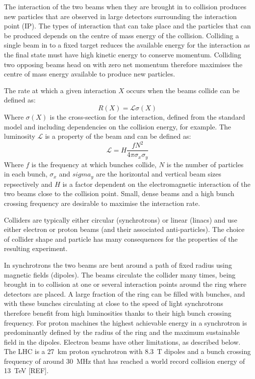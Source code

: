 The interaction of the two beams when they are brought in to collision produces new particles that are observed in large detectors surrounding the interaction point (IP). The types of interaction that can take place and the particles that can be produced depends on the centre of mass energy of the collision. Colliding a single beam in to a fixed target reduces the available energy for the interaction as the final state must have high kinetic energy to conserve momentum. Colliding two opposing beams head on with zero net momentum therefore maximises the centre of mass energy available to produce new particles.

The rate at which a given interaction \(X\) occurs when the beams collide can be defined as:
\begin{equation}
R(X) = \mathscr{L} \sigma(X)
\end{equation}
Where \(\sigma(X)\) is the cross-section for the interaction, defined from the standard model and including dependencies on the collision energy, for example. The luminosity \(\mathscr{L}\) is a property of the beam and can be defined as:
\begin{equation}
\mathscr{L} = H\frac{fN^2}{4\pi\sigma_x\sigma_y}
\end{equation}
Where \(f\) is the frequency at which bunches collide, \(N\) is the number of particles in each bunch, \(\sigma_x\) and \(sigma_y\) are the horizontal and vertical beam sizes repsectively and \(H\) is a factor dependent on the electromagnetic interaction of the two beams close to the collision point. Small, dense beams and a high bunch crossing frequency are desirable to maximise the interaction rate.


Colliders are typically either circular (synchrotrons) or linear (linacs) and use either electron or proton beams (and their associated anti-particles). The choice of collider shape and particle has many consequences for the properties of the resulting experiment. 

In synchrotrons the two beams are bent around a path of fixed radius using magnetic fields (dipoles). The beams circulate the collider many times, being brought in to collision at one or several interaction points around the ring where detectors are placed. A large fraction of the ring can be filled with bunches, and with these bunches circulating at close to the speed of light synchrotrons therefore benefit from high luminosities thanks to their high bunch crossing frequency. For proton machines the highest achievable energy in a synchrotron is predominantly defined by the radius of the ring and the maximum sustainable field in the dipoles. Electron beams have other limitations, as described below. The LHC is a 27~km proton synchrotron with 8.3~T dipoles and a bunch crossing frequency of around 30~MHz that has reached a world record collision energy of 13~TeV [REF].

